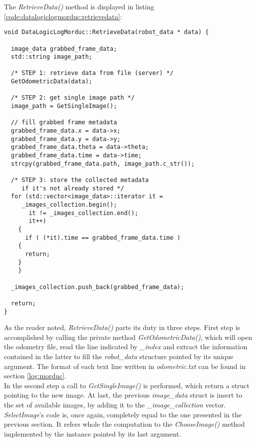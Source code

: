 The \textit{RetrieveData()} method is displayed in listing
\ref{code:datalogiclogmorduc:retrievedata}:

\begin{lstlisting}[caption={\texttt{DataLogicLogSimulator::RetrieveData()} method},
    label={code:datalogiclogmorduc:retrievedata}, frame=trBL]
void DataLogicLogMorduc::RetrieveData(robot_data * data) {

  image_data grabbed_frame_data;
  std::string image_path;

  /* STEP 1: retrieve data from file (server) */
  GetOdometricData(data);

  /* STEP 2: get single image path */
  image_path = GetSingleImage();
   
  // fill grabbed frame metadata
  grabbed_frame_data.x = data->x;
  grabbed_frame_data.y = data->y;
  grabbed_frame_data.theta = data->theta;
  grabbed_frame_data.time = data->time;
  strcpy(grabbed_frame_data.path, image_path.c_str());

  /* STEP 3: store the collected metadata
     if it's not already stored */
  for (std::vector<image_data>::iterator it =
	 _images_collection.begin();
       it != _images_collection.end();
       it++)
    {
      if ( (*it).time == grabbed_frame_data.time )
	{
	  return;
	}
    }

  _images_collection.push_back(grabbed_frame_data);
  
  return;
}
\end{lstlisting}

As the reader noted, \textit{RetrieveData()} parts its duty in
three steps. First step is accomplished by calling the private method
\textit{GetOdometricData()}, which will open the odometry file, read
the line indicated by \textit{\_index} and extract the information
contained in the latter to fill the \textit{robot\_data} structure
pointed by its unique argument. The format of each text line written in
\textit{odometric.txt} can be found in section \ref{log:morduc}.
\\
In the second step a call to \textit{GetSingleImage()} is performed,
which return a struct pointing to the new image.
At last, the previous \textit{image\_data} struct is insert to the set
of available images, by adding it to the \textit{\_image\_collection}
vector.
\\
\textit{SelectImage}'s code is, once again, completely equal to the one
presented in the previous section. It refers whole the computation to the
\textit{ChooseImage()} method implemented by the instance pointed by
its last argument.

